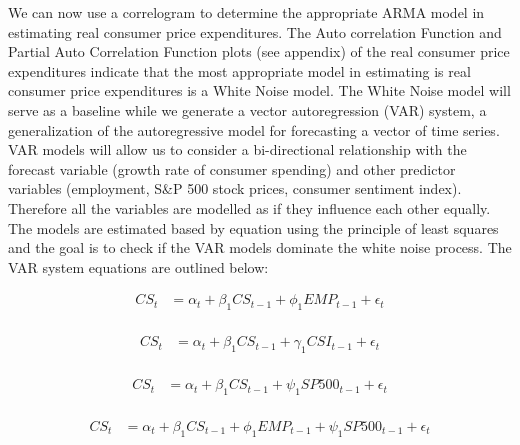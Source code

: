 \documentclass[12pt]{article}
\newcommand{\newpar}{\vspace{0.15in} \noindent}
\begin{document}
\newpar
\newline
We can now use a correlogram to determine the appropriate ARMA model in estimating real consumer price expenditures. The Auto correlation Function and Partial Auto Correlation Function plots (see appendix) of the real consumer price expenditures indicate that the most appropriate model in estimating is real consumer price expenditures is a White Noise model.
\newpar
\newline
The White Noise model will serve as a baseline while we generate a vector autoregression (VAR) system, a generalization of the autoregressive model for forecasting a vector of time series. VAR models will allow us to consider a bi-directional relationship with the forecast variable (growth rate of consumer spending) and other predictor variables (employment, S\&P 500 stock prices, consumer sentiment index). Therefore all the variables are modelled as if they influence each other equally. The models are estimated based by equation using the principle of least squares and the goal is to check if the VAR models dominate the white noise process.
\newpar
\newline
The VAR system equations are outlined below:
\newpar

\begin{equation} 
\begin{split}
CS_{t} & = \alpha_t + \beta_1CS_{t-1} + \phi_1EMP_{t-1} + \epsilon_t\\
\end{split}
\end{equation}

\begin{equation} 
\begin{split}
CS_{t} & = \alpha_t + \beta_1CS_{t-1} + \gamma_1CSI_{t-1} + \epsilon_t\\
\end{split}
\end{equation}

\begin{equation} 
\begin{split}
CS_{t} & = \alpha_t + \beta_1CS_{t-1} + \psi_1SP500_{t-1} + \epsilon_t\\
\end{split}
\end{equation}

\begin{equation} 
\begin{split}
CS_{t} & = \alpha_t + \beta_1CS_{t-1} + \phi_1EMP_{t-1} + \psi_1SP500_{t-1} + \epsilon_t\\
\end{split}
\end{equation}
\end{document}
